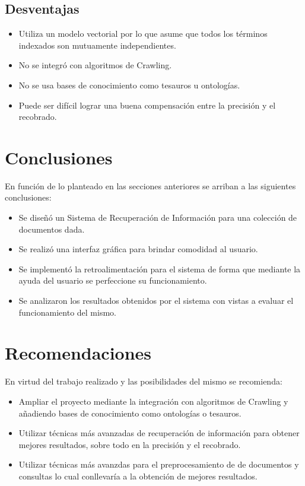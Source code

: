 \documentclass[runningheads]{llncs}
\begin{document}
\subsection{Desventajas}
\begin{itemize}
\item Utiliza un modelo vectorial por lo que asume que todos los t\'erminos indexados son mutuamente independientes.
\item No se integr\'o con algoritmos de Crawling.
\item No se usa bases de conocimiento como tesauros u ontolog\'ias.
\item Puede ser dif\'icil lograr una buena compensaci\'on entre la precisi\'on y el recobrado.
\end{itemize}

\section{Conclusiones}
En funci\'on de lo planteado en las secciones anteriores se arriban a las siguientes conclusiones:
	
	\begin{itemize}
	\item Se dise\~{n}\'o un Sistema de Recuperaci\'on de Informaci\'on para una colecci\'on de documentos dada.
	\item Se realiz\'o una interfaz gr\'afica para brindar comodidad al usuario.
	\item Se implement\'o la retroalimentaci\'on para el sistema de forma que mediante la ayuda del usuario se perfeccione su funcionamiento.
	\item Se analizaron los resultados obtenidos por el sistema con vistas a evaluar el funcionamiento del mismo.
	\end{itemize}
	
	\section{Recomendaciones}
	En virtud del trabajo realizado y las posibilidades del mismo se recomienda:
	\begin{itemize}
	\item Ampliar el proyecto mediante la integraci\'on con algoritmos de Crawling y a\~{n}adiendo bases de conocimiento como ontolog\'ias o tesauros.
	\item Utilizar t\'ecnicas m\'as avanzadas de recuperaci\'on de informaci\'on para obtener mejores resultados, sobre todo en la precisi\'on y el recobrado.
	\item Utilizar t\'ecnicas m\'as avanzdas para el preprocesamiento de de documentos y  consultas lo cual conllevar\'ia a la obtenci\'on de mejores resultados.
	\end{itemize}
	
\end{document}
